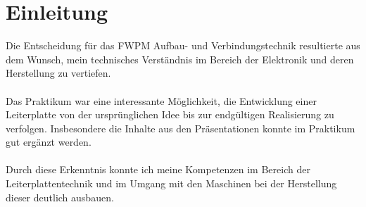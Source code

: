 
\section*{Einleitung}
Die Entscheidung für das FWPM Aufbau- und Verbindungstechnik resultierte aus dem Wunsch, mein technisches Verständnis im Bereich der Elektronik und deren Herstellung zu vertiefen.
\\
\\
Das Praktikum war eine interessante Möglichkeit, die Entwicklung einer Leiterplatte von der ursprünglichen Idee bis zur endgültigen Realisierung zu verfolgen.
Insbesondere die Inhalte aus den Präsentationen konnte im Praktikum gut ergänzt werden.
\\
\\
Durch diese Erkenntnis konnte ich meine Kompetenzen im Bereich der Leiterplattentechnik und im Umgang mit den Maschinen bei der Herstellung dieser deutlich ausbauen.
